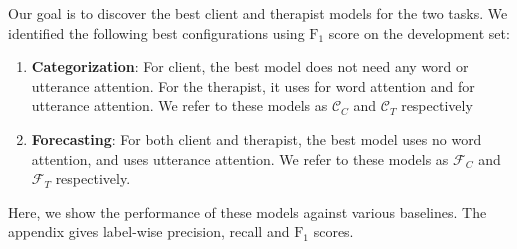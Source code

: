  Our goal is to discover the best client and therapist models for the
two tasks.  We identified the following best configurations using $\text{F}_{1}$
score on the development set:
\begin{enumerate}[nosep]
\item {\bf Categorization}: For client, the best model does not need any
  word or utterance attention. For the therapist, it uses \GMGRUH
  for word attention and \anchor for utterance attention. We refer
  to these models as $\mathcal{C}_C$ and $\mathcal{C}_T$ respectively
\item {\bf Forecasting}: For both client and  therapist, the best
  model uses no word attention, and uses \self utterance
  attention. We refer to these models as $\mathcal{F}_C$ and
  $\mathcal{F}_T$ respectively.
\end{enumerate}
Here, we show the performance of these models against various
baselines. The appendix gives label-wise precision, recall and $\text{F}_{1}$
scores.




